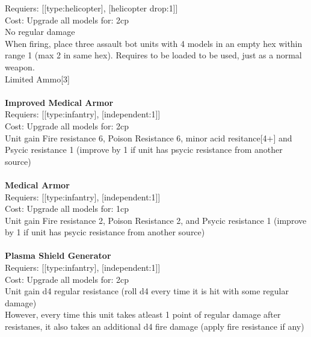 Requiers: [[type:helicopter], [helicopter drop:1]] \\
Cost: Upgrade all models for: 2cp \\
No regular damage\\ 
When firing, place three assault bot units with 4 models in an empty hex within range 1 (max 2 in same hex). Requires to be loaded to be used, just as a normal weapon.\\ 
Limited Ammo[3]\\ 









\ \\
{\bf Improved Medical Armor } \\

Requiers: [[type:infantry], [independent:1]] \\
Cost: Upgrade all models for: 2cp \\
Unit gain Fire resistance 6, Poison Resistance 6, minor acid resitance[4+] and Psycic resistance 1 (improve by 1 if unit has psycic resistance from another source)\\ 









\ \\
{\bf Medical Armor } \\

Requiers: [[type:infantry], [independent:1]] \\
Cost: Upgrade all models for: 1cp \\
Unit gain Fire resistance 2, Poison Resistance 2, and Psycic resistance 1 (improve by 1 if unit has psycic resistance from another source)\\ 









\ \\
{\bf Plasma Shield Generator } \\

Requiers: [[type:infantry], [independent:1]] \\
Cost: Upgrade all models for: 2cp \\
Unit gain d4 regular resistance (roll d4 every time it is hit with some regular damage)\\ 
However, every time this unit takes atleast 1 point of regular damage after resistanes, it also takes an additional d4 fire damage (apply fire resistance if any)\\ 





